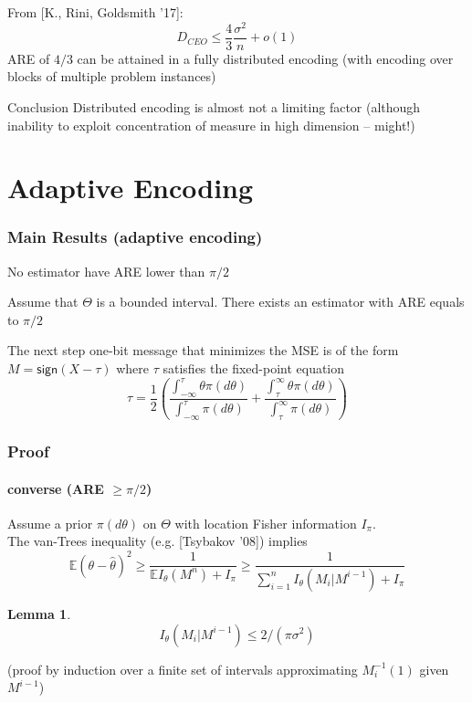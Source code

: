 \documentclass[mathserif]{beamer}
\newcommand{\sgn}{\mathsf{sign}}
\newtheorem{lem}{Lemma}
\begin{document}
\begin{frame}

From [K., Rini, Goldsmith '17]: 
\[
D_{CEO} \leq \frac{4}{3} \frac{\sigma^2}{n} + o(1)
\]
ARE of $4/3$ can be attained in a fully distributed encoding (with encoding over blocks of multiple problem instances)
\bigskip
\begin{alertblock}{Conclusion}
Distributed encoding is almost not a limiting factor 
(although inability to exploit concentration of measure in high dimension -- might!)
\end{alertblock}
\end{frame}

\section{Adaptive Encoding} 

\begin{frame}
\frametitle{Main Results (adaptive encoding)}

\begin{theorem}[converse]
No estimator have ARE lower than $\pi/2$
\end{theorem}

\begin{theorem}[achievability]
Assume that $\Theta$ is a bounded interval. There exists an estimator with ARE equals to $\pi/2$
\end{theorem}

\begin{theorem}
The next step one-bit message that minimizes the MSE is of the form $M = \sgn (X-\tau)$ where $\tau$ satisfies the fixed-point equation 
\[
\tau = \frac{1}{2} \left( \frac{ \int_{-\infty}^\tau \theta \pi(d\theta) }{\int_{-\infty}^\tau \pi(d\theta)}  + \frac{ \int_{\tau}^\infty \theta \pi(d\theta)}{\int_{\tau}^\infty \pi(d\theta)} \right)
\]
\end{theorem}
\end{frame}

\begin{frame}
\frametitle{Proof}
\framesubtitle{converse (ARE $\geq \pi/2$)}
Assume a prior $\pi(d\theta)$ on $\Theta$ with location Fisher information $I_\pi$. \\

The van-Trees inequality (e.g. [Tsybakov '08]) implies
\[
\mathbb E \left(\theta - \widehat{\theta} \right)^2 \geq \frac{1}{\mathbb E I_\theta(M^n) + I_\pi} \geq \frac{1}{\sum_{i=1}^n I_\theta(M_i|M^{i-1}) + I_\pi} 
\]
\begin{lem}
\[
I_\theta(M_i|M^{i-1}) \leq 2/(\pi\sigma^2)
\]
\end{lem}
(proof by induction over a finite set of intervals approximating $M_i^{-1}(1)$ given $M^{i-1}$)
\end{frame}
\end{document}
